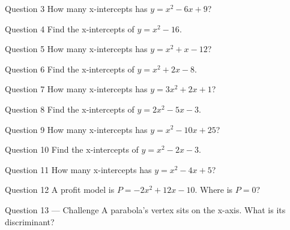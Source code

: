 \documentclass[11pt]{article}
\begin{document}
\begin{qbox}{Question 3}
How many x-intercepts has $y=x^2-6x+9$?\workspace{2.4cm}
\end{qbox}

\begin{qbox}{Question 4}
Find the x-intercepts of $y=x^2-16$.\workspace{2.4cm}
\end{qbox}

\begin{qbox}{Question 5}
How many x-intercepts has $y=x^2+x-12$?\workspace{2.4cm}
\end{qbox}

\begin{qbox}{Question 6}
Find the x-intercepts of $y=x^2+2x-8$.\workspace{2.4cm}
\end{qbox}

\begin{qbox}{Question 7}
How many x-intercepts has $y=3x^2+2x+1$?\workspace{2.4cm}
\end{qbox}

\begin{qbox}{Question 8}
Find the x-intercepts of $y=2x^2-5x-3$.\workspace{2.4cm}
\end{qbox}

\begin{qbox}{Question 9}
How many x-intercepts has $y=x^2-10x+25$?\workspace{2.4cm}
\end{qbox}

\begin{qbox}{Question 10}
Find the x-intercepts of $y=x^2-2x-3$.\workspace{2.4cm}
\end{qbox}

\begin{qbox}{Question 11}
How many x-intercepts has $y=x^2-4x+5$?\workspace{2.4cm}
\end{qbox}

\begin{qbox}{Question 12}
A profit model is $P=-2x^2+12x-10$. Where is $P=0$?\workspace{2.4cm}
\end{qbox}

\begin{qbox}{Question 13 --- Challenge}
A parabola's vertex sits on the x-axis. What is its discriminant?\workspace{2.6cm}
\end{qbox}

\clearpage
{}
\end{document}
